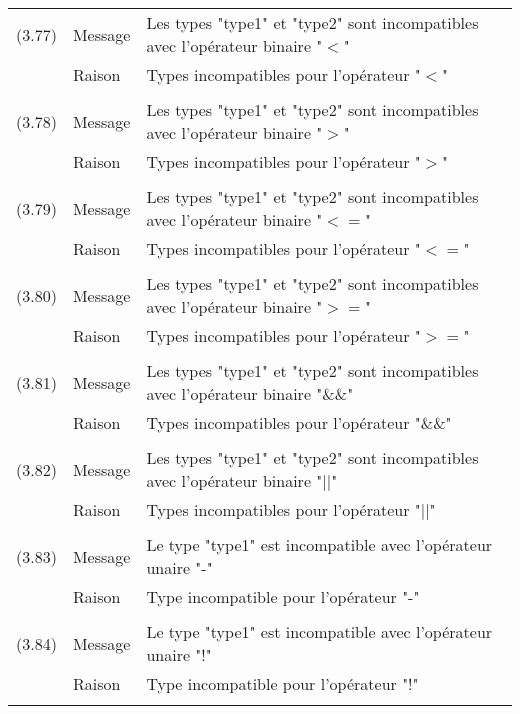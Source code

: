\documentclass[11pt]{article}
\begin{document}
\begin{tabular}{lll}
      \\
      (3.77) & Message & Les types "type1" et "type2" sont incompatibles avec l'opérateur binaire "$<$"\\
      & Raison & Types incompatibles pour l'opérateur "$<$"\\
      \\
      (3.78) & Message & Les types "type1" et "type2" sont incompatibles avec l'opérateur binaire "$>$"\\
      & Raison & Types incompatibles pour l'opérateur "$>$"\\
      \\
      (3.79) & Message & Les types "type1" et "type2" sont incompatibles avec l'opérateur binaire "$<=$"\\
      & Raison & Types incompatibles pour l'opérateur "$<=$"\\
      \\
      (3.80) & Message & Les types "type1" et "type2" sont incompatibles avec l'opérateur binaire "$>=$"\\
      & Raison & Types incompatibles pour l'opérateur "$>=$"\\
      \\
      (3.81) & Message & Les types "type1" et "type2" sont incompatibles avec l'opérateur binaire "\&\&"\\
      & Raison & Types incompatibles pour l'opérateur "\&\&"\\
      \\
      (3.82) & Message & Les types "type1" et "type2" sont incompatibles avec l'opérateur binaire "$||$"\\
      & Raison & Types incompatibles pour l'opérateur "$||$"\\
      \\
      (3.83) & Message & Le type "type1" est incompatible avec l'opérateur unaire "-"\\
      & Raison & Type incompatible pour l'opérateur "-"\\
      \\
      (3.84) & Message & Le type "type1" est incompatible avec l'opérateur unaire "!"\\
      & Raison & Type incompatible pour l'opérateur "!"\\           
      \\
      \end{tabular}
      
\end{document}
